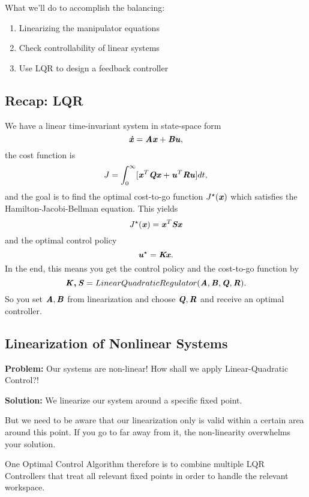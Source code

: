 What we'll do to accomplish the balancing: 
\begin{enumerate}
\item Linearizing the manipulator equations
\item Check controllability of linear systems
\item Use LQR to design a feedback controller
\end{enumerate}
\subsection{Recap: LQR}
We have a linear time-invariant system in state-space form
\begin{equation*} 
\bm{\mathit{\dot{x}}}=\bm{\mathit{Ax}}+\bm{\mathit{Bu}},
\end{equation*}
the cost function is 
\begin{equation*} 
J = \int_0^{\infty}[\bm{\mathit{x}}^T\bm{\mathit{Qx}}+\bm{\mathit{u}}	^T\bm{\mathit{Ru}}]dt,
\end{equation*}
and the goal is to find the optimal cost-to-go function $J^\star(\bm{\mathit{x}})$ which satisfies the Hamilton-Jacobi-Bellman equation.
This yields 
\begin{equation*} 
J^\star(\bm{\mathit{x}}) = \bm{\mathit{x}}^T\bm{\mathit{Sx}}
\end{equation*}
and the optimal control policy 
\begin{equation*} 
\bm{\mathit{u}}^\star=\bm{\mathit{Kx}}.
\end{equation*}
In the end, this means you get the control policy and the cost-to-go function by
\begin{equation*} 
\bm{\mathit{K,S}}=LinearQuadraticRegulator(\bm{\mathit{A}}, \bm{\mathit{B}}, \bm{\mathit{Q}}, \bm{\mathit{R}}).
\end{equation*}
So you set $\bm{\mathit{A}}, \bm{\mathit{B}}$ from linearization and choose $\bm{\mathit{Q}}, \bm{\mathit{R}}$ and receive an optimal controller.

\subsection{Linearization of Nonlinear Systems}
\textbf{Problem:} Our systems are non-linear! How shall we apply Linear-Quadratic Control?!

\textbf{Solution:} We linearize our system around a specific fixed point.

But we need to be aware that our linearization only is valid within a certain area around this point. If you go to far away from it, the non-linearity overwhelms your solution. 

One Optimal Control Algorithm therefore is to combine multiple LQR Controllers that treat all relevant fixed points in order to handle the relevant workspace. 

